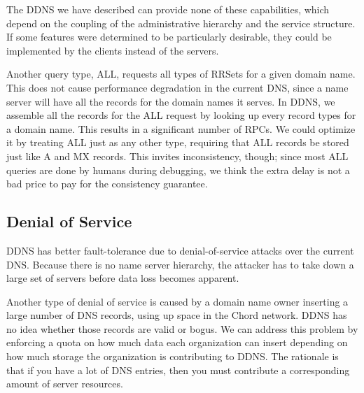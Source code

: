 The DDNS we have described
can provide none of these capabilities, which depend
on the coupling of the administrative hierarchy and the service
structure.
If some features were determined to be particularly desirable,
they could be implemented by the clients instead of the servers.

Another query type, ALL, requests all types of RRSets for
a given domain name. This does not cause performance 
degradation in the current DNS, since a name server
will have all the records for the domain names it serves.
In DDNS, we assemble all the records for the ALL 
request by looking up every record types for a domain 
name.
This results in a significant number of RPCs. 
We could optimize it by treating ALL just as any other type,
requiring that ALL records be stored just like A and MX records.
This invites inconsistency, though; since most ALL queries are
done by humans during debugging, we think the extra
delay is not a bad price to pay for the consistency guarantee.

\subsection{Denial of Service}

DDNS has better fault-tolerance due to denial-of-service attacks 
over the current DNS. 
Because there is no name server hierarchy, the 
attacker has to take down a large
set of servers before data loss becomes apparent.

Another type of denial of service is caused by 
a domain name owner inserting a large number 
of DNS records, using up space in the Chord network.
DDNS has no idea whether those records
are valid or bogus. We can address this problem 
by enforcing a quota on how much data each organization
can insert depending on how much storage the organization
is contributing to DDNS. The rationale is that if you
have a lot of DNS entries, then you must contribute a 
corresponding amount of server resources.

